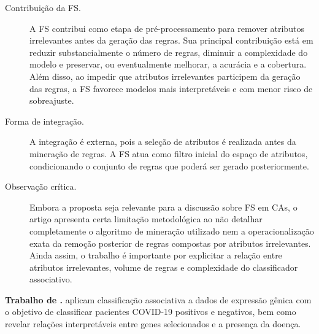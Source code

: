 \begin{description}
    \item[Contribuição da FS.] A FS contribui como etapa de pré-processamento para remover atributos irrelevantes antes da geração das regras. Sua principal contribuição está em reduzir substancialmente o número de regras, diminuir a complexidade do modelo e preservar, ou eventualmente melhorar, a acurácia e a cobertura. Além disso, ao impedir que atributos irrelevantes participem da geração das regras, a FS favorece modelos mais interpretáveis e com menor risco de sobreajuste.

    \item[Forma de integração.] A integração é externa, pois a seleção de atributos é realizada antes da mineração de regras. A FS atua como filtro inicial do espaço de atributos, condicionando o conjunto de regras que poderá ser gerado posteriormente.

    \item[Observação crítica.] Embora a proposta seja relevante para a discussão sobre FS em CAs, o artigo apresenta certa limitação metodológica ao não detalhar completamente o algoritmo de mineração utilizado nem a operacionalização exata da remoção posterior de regras compostas por atributos irrelevantes. Ainda assim, o trabalho é importante por explicitar a relação entre atributos irrelevantes, volume de regras e complexidade do classificador associativo.
\end{description}


\textbf{Trabalho de .} 
 aplicam classificação associativa a dados de expressão gênica com o objetivo de classificar pacientes COVID-19 positivos e negativos, bem como revelar relações interpretáveis entre genes selecionados e a presença da doença.

